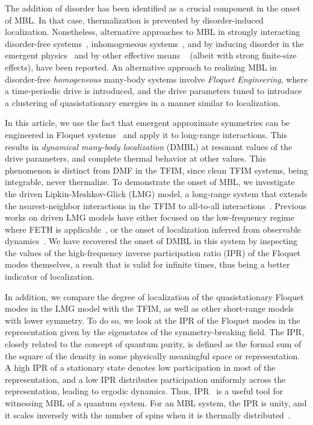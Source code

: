 \documentclass[%
reprint,
superscriptaddress,
amsmath,amssymb,
aps,
prb,
showkeys,
]{revtex4-2}
\begin{document}
The addition of disorder has been identified as a crucial component in the onset of MBL. In that case, thermalization is prevented by disorder-induced localization. Nonetheless, alternative approaches to MBL in strongly interacting disorder-free systems~\cite{diptiman2014, Carleo2012,aditya2023dynamical}, inhomogeneous systems~\cite{alessandro_markus, Grover2014,miles2015,Smith2017}, and by inducing disorder in the emergent physics~\cite{MBL_emergent_disorder} and by other effective means ~\cite{miles2015} (albeit with strong finite-size effects), have been reported. An alternative approach to realizing MBL in disorder-free \emph{homogeneous} many-body systems involve \textit{Floquet Engineering}, where a time-periodic drive is introduced, and the drive parameters tuned to introduce a clustering of quasistationary energies in a manner similar to localization\cite{zhang_floquet_2016}.


In this article, we use the fact that emergent approximate symmetries can be engineered in Floquet systems~\cite{Engelhardt2013,asmi:scars} and apply it to long-range interactions. This results in \textit{dynamical many-body localization} (DMBL) at resonant values of the drive parameters, and complete thermal behavior at other values. This phenomenon is distinct from DMF in the TFIM, since clean TFIM systems, being integrable, never thermalize. To demonstrate the onset of MBL, we investigate the driven Lipkin-Meshkov-Glick (LMG) model\cite{lmg1965_1,lmg1965_2, lmg1965_3, debergh_2001, ribeiro2008,Engelhardt2013,titum2020}, a long-range system that extends the nearest-neighbor interactions in the TFIM to  all-to-all interactions~\cite{campa_statistical_2009, eisele_multiple_1988, canning_class_1992}. Previous works on driven LMG models have either focused on the low-frequency regime where FETH is applicable~\cite{russomanno_thermalization_2015}, or the onset of localization inferred from observable dynamics~\cite{Engelhardt2013, lmg:fidelity, Russomanno2017}.  We have recovered the onset of DMBL in this system by inspecting the values of the high-frequency inverse participation ratio (IPR) of the Floquet modes themselves, a result that is valid for infinite times, thus being a better indicator of localization.

In addition, we compare the degree of localization of the quasistationary Floquet modes in the LMG model with the TFIM, as well as other short-range models with lower symmetry. To do so, we look at the IPR of the Floquet modes in the representation given by the eigenstates of the symmetry-breaking field. The IPR, closely related to the concept of quantum purity, is defined as the formal sum of the square of the density in some physically meaningful space or representation. A high IPR of a stationary state denotes low participation in most of the representation, and a low IPR distributes participation uniformly across the representation, leading to ergodic dynamics\cite{vu_fermionic_2022}. Thus, IPR~\cite{Misguich2016} is a useful tool for witnessing MBL of a quantum system. For an MBL system, the IPR is unity, and it scales inversely with the {number of spins} when it is thermally distributed~\cite{calixto_inverse_2015}.
\end{document}
